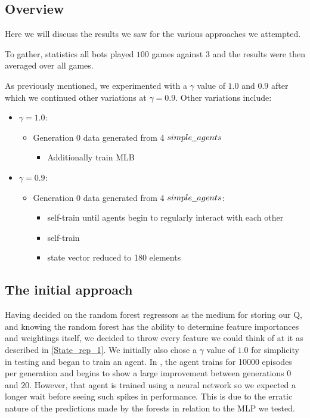\subsection{Overview}
Here we will discuss the results we saw for the various approaches we attempted.

To gather, statistics all bots played $100$ games against $3$  and the results were then averaged over all games.

As previously mentioned, we experimented with a $\gamma$ value of $1.0$ and $0.9$ after which we continued other variations at $\gamma = 0.9$.
Other variations include:
\begin{itemize}
	\item $\gamma = 1.0$:
	\begin{itemize}
		\item Generation 0 data generated from 4 $\code{simple\_agents}$
		\begin{itemize}
			\item Additionally train MLB
		\end{itemize}
	\end{itemize}
	\item $\gamma = 0.9$:
	\begin{itemize}
		\item Generation 0 data generated from 4 $\code{simple\_agents}$:
		\begin{itemize}
			\item self-train until agents begin to regularly interact with each other
			\item self-train
			\item state vector reduced to 180 elements
		\end{itemize}
	\end{itemize}
\end{itemize}

\subsection{The initial approach}
Having decided on the random forest regressors as the medium for storing our Q, and knowing the random forest has the ability to determine feature importances and weightings itself, we decided to throw every feature we could think of at it as described in \ref{State_rep_1}. We initially also chose a $\gamma$ value of $1.0$ for simplicity in testing and began to train an agent. In \cite{paper}, the agent trains for 10000 episodes per generation and begins to show a large improvement between generations $0$ and $20$. However, that agent is trained using a neural network so we expected a longer wait before seeing such spikes in performance. This is due to the erratic nature of the predictions made by the forests in relation to the MLP we tested.

